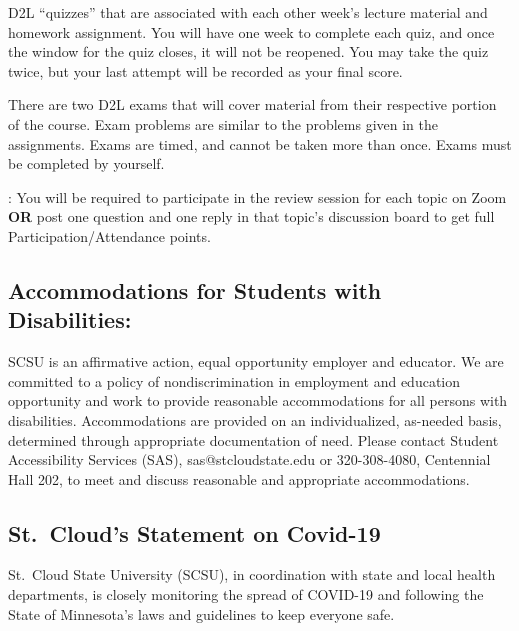 \documentclass{tufte-handout}
\begin{document}
\begin{fullwidth}

  D2L ``quizzes'' that are associated with each other week's lecture material and homework assignment. You will have one week to complete each quiz, and once the window for the quiz closes, it will not be reopened. You may take the quiz twice, but your last attempt will be recorded as your final score.



 There are two D2L exams that will cover material from their respective portion of the course. Exam problems are similar to the problems given in the assignments. Exams are timed, and cannot be taken more than once. Exams must be completed by yourself.



: You will be required to participate in the review session for each topic on Zoom \textbf{OR} post one question and one reply in that topic's discussion board to get full Participation/Attendance points. 



\subsection{Accommodations for Students with Disabilities: } 

SCSU is an affirmative action, equal opportunity employer and educator. We are committed to a policy of nondiscrimination in employment and education opportunity and work to provide reasonable accommodations for all persons with disabilities. Accommodations are provided on an individualized, as-needed basis, determined through appropriate documentation of need. Please contact Student Accessibility Services (SAS), sas@stcloudstate.edu or 320-308-4080, Centennial Hall 202, to meet and discuss reasonable and appropriate accommodations. 






\newpage



\subsection*{St.\ Cloud's Statement on Covid-19}

St.\ Cloud State University (SCSU), in coordination with state and local health departments, is closely monitoring the spread of COVID-19 and following the State of Minnesota's laws and guidelines to keep everyone safe.


\end{fullwidth}
\end{document}
